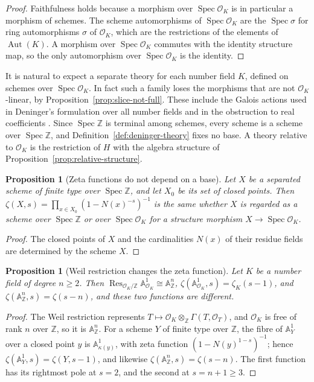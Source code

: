 \documentclass[11pt]{amsart}
\theoremstyle{plain}
\newtheorem{proposition}[theorem]{Proposition}
\theoremstyle{definition}
\theoremstyle{remark}
\numberwithin{equation}{section}
\newcommand{\Z}{\mathbb{Z}}
\newcommand{\cO}{\mathcal{O}}
\DeclareMathOperator{\Spec}{Spec}
\begin{document}
\begin{proof}
Faithfulness holds because a morphism over $\Spec\cO_K$ is in
particular a morphism of schemes. The scheme automorphisms of
$\Spec\cO_K$ are the $\Spec\sigma$ for ring automorphisms $\sigma$ of
$\cO_K$, which are the restrictions of the elements of
$\operatorname{Aut}(K)$. A morphism over $\Spec\cO_K$ commutes with
the identity structure map, so the only automorphism over
$\Spec\cO_K$ is the identity.
\end{proof}

It is natural to expect a separate theory for each number field $K$,
defined on schemes over $\Spec\cO_K$. In fact such a family loses the
morphisms that are not $\cO_K$-linear, by
Proposition~\ref{prop:slice-not-full}. These include the Galois
actions used in Deninger's formulation over all number fields
\cite[Prediction~2.13, p.~8]{Deninger2025BSDDedekind} and in the
obstruction to real coefficients
\cite[2.9, p.~4, and Theorem~2.13, p.~5]{Deninger2022NoWeil}. Since
$\Spec\Z$ is terminal among schemes, every scheme is a scheme over
$\Spec\Z$, and Definition~\ref{def:deninger-theory} fixes no base. A
theory relative to $\cO_K$ is the restriction of $H$ with the algebra
structure of Proposition~\ref{prop:relative-structure}.

\begin{proposition}[Zeta functions do not depend on a base]
\label{prop:zeta-intrinsic}
Let $X$ be a separated scheme of finite type over $\Spec\Z$, and let
$X_0$ be its set of closed points. Then
$\zeta(X,s)=\prod_{x\in X_0}(1-N(x)^{-s})^{-1}$ is the same whether
$X$ is regarded as a scheme over $\Spec\Z$ or over $\Spec\cO_K$ for a
structure morphism $X\to\Spec\cO_K$.
\end{proposition}

\begin{proof}
The closed points of $X$ and the cardinalities $N(x)$ of their residue
fields are determined by the scheme $X$.
\end{proof}

\begin{proposition}[Weil restriction changes the zeta function]
\label{prop:weil-restriction}
Let $K$ be a number field of degree $n\ge2$. Then
$\operatorname{Res}_{\cO_K/\Z}\mathbb A^1_{\cO_K}\cong\mathbb A^n_\Z$,
$\zeta(\mathbb A^1_{\cO_K},s)=\zeta_K(s-1)$, and
$\zeta(\mathbb A^n_\Z,s)=\zeta(s-n)$, and these two functions are
different.
\end{proposition}

\begin{proof}
The Weil restriction represents $T\mapsto\cO_K\otimes_\Z\Gamma(T,\cO_T)$,
and $\cO_K$ is free of rank $n$ over $\Z$, so it is $\mathbb A^n_\Z$.
For a scheme $Y$ of finite type over $\Z$, the fibre of
$\mathbb A^1_Y$ over a closed point $y$ is $\mathbb A^1_{\kappa(y)}$,
with zeta function $(1-N(y)^{1-s})^{-1}$; hence
$\zeta(\mathbb A^1_Y,s)=\zeta(Y,s-1)$, and likewise
$\zeta(\mathbb A^n_\Z,s)=\zeta(s-n)$. The first function has its
rightmost pole at $s=2$, and the second at $s=n+1\ge3$.
\end{proof}
\end{document}
